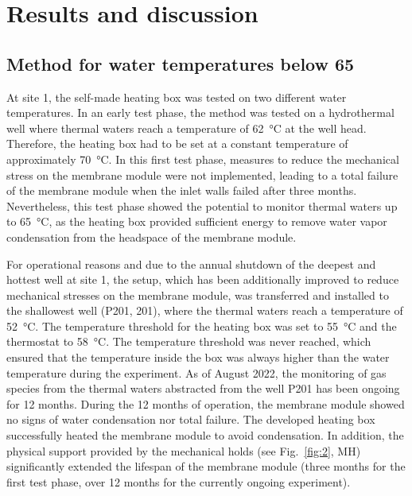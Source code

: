 \section{Results and discussion}
\subsection{Method for water temperatures below 65\textcelsius}
At site 1, the self-made heating box was tested on two different water temperatures.
In an early test phase, the method was tested on a hydrothermal well where thermal waters reach a temperature of \SI{62}{\celsius} at the well head.
Therefore, the heating box had to be set at a constant temperature of approximately \SI{70}{\celsius}. 
In this first test phase, measures to reduce the mechanical stress on the membrane module were not implemented, leading to a total failure of the membrane module when the inlet walls failed after three months. 
Nevertheless, this test phase showed the potential to monitor thermal waters up to \SI{65}{\celsius}, as the heating box provided sufficient energy to remove water vapor condensation from the headspace of the membrane module. 

For operational reasons and due to the annual shutdown of the deepest and hottest well at site 1, the setup, which has been additionally improved to reduce mechanical stresses on the membrane module, was transferred and installed to the shallowest well (P201, \SI{201}{\mbgl}), where the thermal waters reach a temperature of \SI{52}{\celsius}.
The temperature threshold for the heating box was set to \SI{55}{\celsius} and the thermostat to \SI{58}{\celsius}.
The temperature threshold was never reached, which ensured that the temperature inside the box was always higher than the water temperature during the experiment.
As of August 2022, the monitoring of gas species from the thermal waters abstracted from the well P201 has been ongoing for 12 months. 
During the 12 months of operation, the membrane module showed no signs of water condensation nor total failure. 
The developed heating box successfully heated the membrane module to avoid condensation.
In addition, the physical support provided by the mechanical holds (see Fig.~\ref{fig:2}, MH) significantly extended the lifespan of the membrane module (three months for the first test phase, over 12 months for the currently ongoing experiment).

